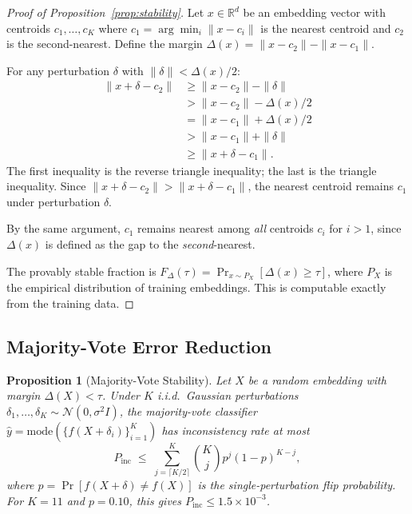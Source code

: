 \documentclass[11pt]{article}
\newtheorem{proposition}[theorem]{Proposition}
\begin{document}
\begin{proof}[Proof of Proposition~\ref{prop:stability}]
Let $x \in \mathbb{R}^d$ be an embedding vector with centroids
$c_1, \ldots, c_K$ where $c_1 = \arg\min_i \|x - c_i\|$ is the
nearest centroid and $c_2$ is the second-nearest.  Define the
margin $\Delta(x) = \|x - c_2\| - \|x - c_1\|$.

For any perturbation $\delta$ with $\|\delta\| < \Delta(x)/2$:
\begin{align*}
\|x + \delta - c_2\| &\ge \|x - c_2\| - \|\delta\| \\
  &> \|x - c_2\| - \Delta(x)/2 \\
  &= \|x - c_1\| + \Delta(x)/2 \\
  &> \|x - c_1\| + \|\delta\| \\
  &\ge \|x + \delta - c_1\|.
\end{align*}
The first inequality is the reverse triangle inequality; the last is
the triangle inequality.  Since $\|x + \delta - c_2\| > \|x + \delta - c_1\|$,
the nearest centroid remains $c_1$ under perturbation $\delta$.

By the same argument, $c_1$ remains nearest among \emph{all} centroids
$c_i$ for $i > 1$, since $\Delta(x)$ is defined as the gap to the
\emph{second}-nearest.

The provably stable fraction is $F_\Delta(\tau) = \Pr_{x \sim P_X}[\Delta(x) \ge \tau]$,
where $P_X$ is the empirical distribution of training embeddings.
This is computable exactly from the training data.
\end{proof}

\subsection{Majority-Vote Error Reduction}

\begin{proposition}[Majority-Vote Stability]
Let $X$ be a random embedding with margin $\Delta(X) < \tau$.
Under $K$ i.i.d.\ Gaussian perturbations $\delta_1, \ldots, \delta_K
\sim \mathcal{N}(0, \sigma^2 I)$, the majority-vote classifier
$\hat{y} = \mathrm{mode}(\{f(X + \delta_i)\}_{i=1}^K)$ has
inconsistency rate at most
\[
  P_{\mathrm{inc}} \;\le\; \sum_{j=\lceil K/2\rceil}^{K}
    \binom{K}{j} p^j (1-p)^{K-j},
\]
where $p = \Pr[f(X + \delta) \neq f(X)]$ is the single-perturbation
flip probability.  For $K = 11$ and $p = 0.10$, this gives
$P_{\mathrm{inc}} \le 1.5 \times 10^{-3}$.
\end{proposition}
\end{document}
